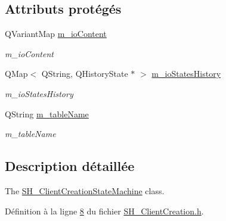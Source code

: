 \subsection*{Attributs protégés}
\begin{DoxyCompactItemize}
\item 
Q\-Variant\-Map \hyperlink{classSH__InOutStateMachine_a661a1c7bd3b1086b3b5cd60ca957ecbd}{m\-\_\-io\-Content}
\begin{DoxyCompactList}\small\item\em m\-\_\-io\-Content \end{DoxyCompactList}\item 
Q\-Map$<$ Q\-String, Q\-History\-State $\ast$ $>$ \hyperlink{classSH__InOutStateMachine_aaca2ea542b3f5b4cd238396b07492455}{m\-\_\-io\-States\-History}
\begin{DoxyCompactList}\small\item\em m\-\_\-io\-States\-History \end{DoxyCompactList}\item 
Q\-String \hyperlink{classSH__InOutStateMachine_acc0f5d5133af2dcca30939f53ec8837b}{m\-\_\-table\-Name}
\begin{DoxyCompactList}\small\item\em m\-\_\-table\-Name \end{DoxyCompactList}\end{DoxyCompactItemize}


\subsection{Description détaillée}
The \hyperlink{classSH__ClientCreationStateMachine}{S\-H\-\_\-\-Client\-Creation\-State\-Machine} class. 

Définition à la ligne \hyperlink{SH__ClientCreation_8h_source_l00008}{8} du fichier \hyperlink{SH__ClientCreation_8h_source}{S\-H\-\_\-\-Client\-Creation.\-h}.



